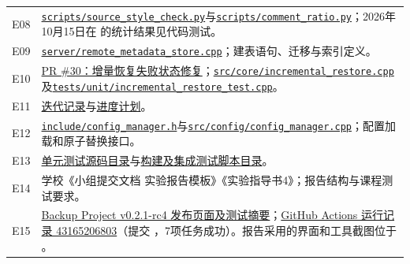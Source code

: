 \begin{longtable}{L{.10\linewidth}L{.79\linewidth}}
E08 & \href{https://github.com/PlyusWang/backup-project/blob/0c07045ec7d4ff7dc6fa3646425c0d119a0f3e6c/scripts/source_style_check.py}{\nolinkurl{scripts/source_style_check.py}}与\href{https://github.com/PlyusWang/backup-project/blob/0c07045ec7d4ff7dc6fa3646425c0d119a0f3e6c/scripts/comment_ratio.py}{\nolinkurl{scripts/comment_ratio.py}}；2026年10月15日在  的统计结果见代码测试。\\
E09 & \href{https://github.com/PlyusWang/backup-project/blob/0c07045ec7d4ff7dc6fa3646425c0d119a0f3e6c/server/remote_metadata_store.cpp}{\nolinkurl{server/remote_metadata_store.cpp}}；建表语句、迁移与索引定义。\\
E10 & \href{https://github.com/PlyusWang/backup-project/pull/30}{PR \#30：增量恢复失败状态修复}；\href{https://github.com/PlyusWang/backup-project/blob/0c07045ec7d4ff7dc6fa3646425c0d119a0f3e6c/src/core/incremental_restore.cpp}{\nolinkurl{src/core/incremental_restore.cpp}}及\href{https://github.com/PlyusWang/backup-project/blob/0c07045ec7d4ff7dc6fa3646425c0d119a0f3e6c/tests/unit/incremental_restore_test.cpp}{\nolinkurl{tests/unit/incremental_restore_test.cpp}}。\\
E11 & \href{https://github.com/PlyusWang/backup-project/tree/0c07045ec7d4ff7dc6fa3646425c0d119a0f3e6c/docs/scrum/}{迭代记录}与\href{https://github.com/PlyusWang/backup-project/tree/0c07045ec7d4ff7dc6fa3646425c0d119a0f3e6c/docs/gantt/}{进度计划}。\\
E12 & \href{https://github.com/PlyusWang/backup-project/blob/0c07045ec7d4ff7dc6fa3646425c0d119a0f3e6c/include/config_manager.h}{\nolinkurl{include/config_manager.h}}与\href{https://github.com/PlyusWang/backup-project/blob/0c07045ec7d4ff7dc6fa3646425c0d119a0f3e6c/src/config/config_manager.cpp}{\nolinkurl{src/config/config_manager.cpp}}；配置加载和原子替换接口。\\
E13 & \href{https://github.com/PlyusWang/backup-project/tree/0c07045ec7d4ff7dc6fa3646425c0d119a0f3e6c/tests/unit/}{单元测试源码目录}与\href{https://github.com/PlyusWang/backup-project/tree/0c07045ec7d4ff7dc6fa3646425c0d119a0f3e6c/scripts/}{构建及集成测试脚本目录}。\\
E14 & 学校《小组提交文档 实验报告模板》《实验指导书4》；报告结构与课程测试要求。\\
E15 & \href{https://github.com/PlyusWang/backup-project/releases/tag/v0.2.1-rc4}{Backup Project v0.2.1-rc4 发布页面及测试摘要}；\href{https://github.com/PlyusWang/backup-project/actions/runs/43165206803}{GitHub Actions 运行记录 43165206803}（提交 ，7项任务成功）。报告采用的界面和工具截图位于 。\\

\end{longtable}
